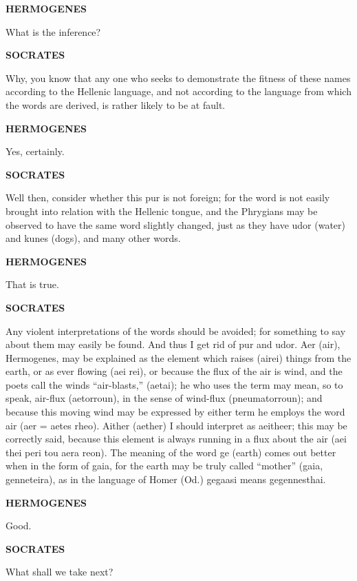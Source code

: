 \documentclass[11pt,letter]{article}
\begin{document}
\par \textbf{HERMOGENES}
\par   What is the inference?

\par \textbf{SOCRATES}
\par   Why, you know that any one who seeks to demonstrate the fitness of these names according to the Hellenic language, and not according to the language from which the words are derived, is rather likely to be at fault.

\par \textbf{HERMOGENES}
\par   Yes, certainly.

\par \textbf{SOCRATES}
\par   Well then, consider whether this pur is not foreign; for the word is not easily brought into relation with the Hellenic tongue, and the Phrygians may be observed to have the same word slightly changed, just as they have udor (water) and kunes (dogs), and many other words.

\par \textbf{HERMOGENES}
\par   That is true.

\par \textbf{SOCRATES}
\par   Any violent interpretations of the words should be avoided; for something to say about them may easily be found. And thus I get rid of pur and udor. Aer (air), Hermogenes, may be explained as the element which raises (airei) things from the earth, or as ever flowing (aei rei), or because the flux of the air is wind, and the poets call the winds “air-blasts,” (aetai); he who uses the term may mean, so to speak, air-flux (aetorroun), in the sense of wind-flux (pneumatorroun); and because this moving wind may be expressed by either term he employs the word air (aer = aetes rheo). Aither (aether) I should interpret as aeitheer; this may be correctly said, because this element is always running in a flux about the air (aei thei peri tou aera reon). The meaning of the word ge (earth) comes out better when in the form of gaia, for the earth may be truly called “mother” (gaia, genneteira), as in the language of Homer (Od.) gegaasi means gegennesthai.

\par \textbf{HERMOGENES}
\par   Good.

\par \textbf{SOCRATES}
\par   What shall we take next?
\end{document}
